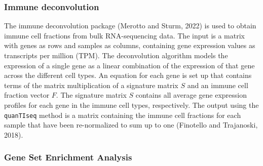 \documentclass[
  parskip,
  oneside]{\documentclass[oneside]{book}}
\begin{document}
\hypertarget{immune-deconvolution}{%
\subsubsection{Immune deconvolution}\label{immune-deconvolution}}

The immune deconvolution package (Merotto and Sturm, 2022) is used to
obtain immune cell fractions from bulk RNA-sequencing data. The input is
a matrix with genes as rows and samples as columns, containing gene
expression values as transcripts per million (TPM). The deconvolution
algorithm models the expression of a single gene as a linear combination
of the expression of that gene across the different cell types. An
equation for each gene is set up that contains terms of the matrix
multiplication of a signature matrix \(S\) and an immune cell fraction
vector \(F\). The signature matrix \(S\) contains all average gene
expression profiles for each gene in the immune cell types,
respectively. The output using the \texttt{quanTIseq} method is a matrix
containing the immune cell fractions for each sample that have been
re-normalized to sum up to one (Finotello and Trajanoski, 2018).

\hypertarget{gene-set-enrichment-analysis}{%
\subsubsection{Gene Set Enrichment
Analysis}\label{gene-set-enrichment-analysis}}
\end{document}
